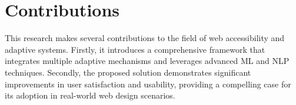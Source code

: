 \documentclass[11pt]{article}
\begin{document}
\section{Contributions}
This research makes several contributions to the field of web accessibility and adaptive systems. Firstly, it introduces a comprehensive framework that integrates multiple adaptive mechanisms and leverages advanced ML and NLP techniques. Secondly, the proposed solution demonstrates significant improvements in user satisfaction and usability, providing a compelling case for its adoption in real-world web design scenarios.



\end{document}
